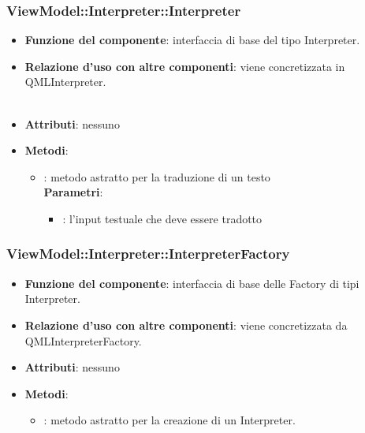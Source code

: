 \subsubsection{ViewModel::Interpreter::Interpreter}
\begin{itemize}
\item\textbf{Funzione del componente}: interfaccia di base del tipo Interpreter.
	\item\textbf{Relazione d'uso con altre componenti}: viene concretizzata in QMLInterpreter.\\ \\

\item\textbf{Attributi}: nessuno
\item\textbf{Metodi}:
	\begin{itemize}
		\item{}: metodo astratto per la traduzione di un testo\\
		\textbf{Parametri}:
			\begin{itemize}
				\item{}: l'input testuale che deve essere tradotto \\
			\end{itemize}
	\end{itemize}
\end{itemize}

\subsubsection{ViewModel::Interpreter::InterpreterFactory}
\begin{itemize}
\item\textbf{Funzione del componente}: interfaccia di base delle Factory di tipi Interpreter.
	\item\textbf{Relazione d'uso con altre componenti}: viene concretizzata da QMLInterpreterFactory.\\ 
\item\textbf{Attributi}: nessuno
\item\textbf{Metodi}:
	\begin{itemize}
		\item{}: metodo astratto per la creazione di un Interpreter.\\
	\end{itemize}
\end{itemize}

